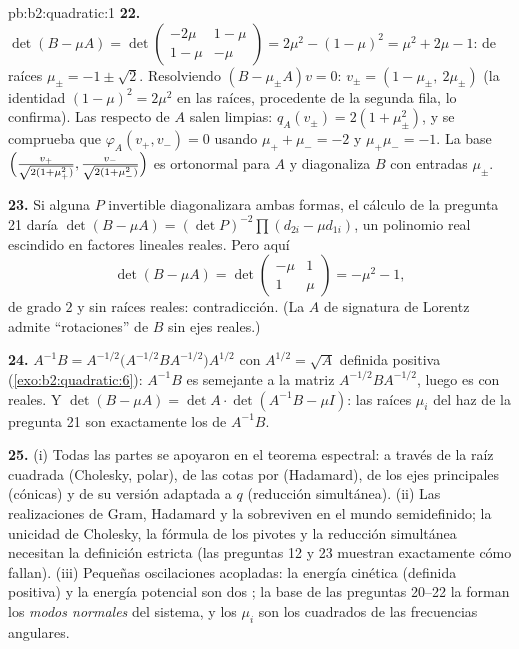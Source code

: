 \begin{solution}{pb:b2:quadratic:1}
\textbf{22.} $\det(B - \mu A) = \det\begin{pmatrix} -2\mu & 1-\mu\\
1-\mu & -\mu\end{pmatrix} = 2\mu^2 - (1-\mu)^2 = \mu^2 + 2\mu - 1$: de
raíces $\mu_\pm = -1 \pm \sqrt2$. Resolviendo $(B - \mu_\pm A)v = 0$:
$v_\pm = (1 - \mu_\pm,\ 2\mu_\pm)$ (la identidad $(1-\mu)^2 = 2\mu^2$
en las raíces, procedente de la segunda fila, lo confirma). Las 
respecto de $A$ salen limpias: $q_A(v_\pm) = 2(1 + \mu_\pm^2)$, y se
comprueba que $\varphi_A(v_+, v_-) = 0$ usando $\mu_+ + \mu_- = -2$ y
$\mu_+\mu_- = -1$. La base $\Bigl(\frac{v_+}{\sqrt{2(1 + \mu_+^2)}},
\frac{v_-}{\sqrt{2(1+\mu_-^2)}}\Bigr)$ es ortonormal para $A$ y
diagonaliza $B$ con entradas $\mu_\pm$.

\textbf{23.} Si alguna $P$ invertible diagonalizara ambas formas, el
cálculo de la pregunta 21 daría $\det(B - \mu A) = (\det
P)^{-2}\prod(d_{2i} - \mu d_{1i})$, un polinomio real escindido en
factores lineales reales. Pero aquí
\[
\det(B - \mu A) = \det\begin{pmatrix} -\mu & 1\\ 1 &
\mu\end{pmatrix} = -\mu^2 - 1 ,
\]
de grado $2$ y sin raíces reales: contradicción. (La $A$ de signatura
de Lorentz admite ``rotaciones'' de $B$ sin ejes reales.)

\textbf{24.} $A^{-1}B = A^{-1/2}\bigl(A^{-1/2}BA^{-1/2}\bigr) A^{1/2}$
con $A^{1/2} = \sqrt A$ definida positiva (\cref{exo:b2:quadratic:6}):
$A^{-1}B$ es semejante a la matriz \emph{}
$A^{-1/2}BA^{-1/2}$, luego es  con 
reales. Y $\det(B - \mu A) = \det A\cdot \det(A^{-1}B - \mu I)$: las
raíces $\mu_i$ del haz de la pregunta 21 son exactamente los
 de $A^{-1}B$.

\textbf{25.} (i) Todas las partes se apoyaron en el teorema espectral:
a través de la raíz cuadrada (Cholesky, polar), de las cotas por
 (Hadamard), de los ejes principales (cónicas) y de su
versión adaptada a $q$ (reducción simultánea). (ii) Las realizaciones
de Gram, Hadamard y la  sobreviven en el mundo
semidefinido; la unicidad de Cholesky, la fórmula de los pivotes y la
reducción simultánea necesitan la definición estricta (las preguntas 12
y 23 muestran exactamente cómo fallan). (iii) Pequeñas oscilaciones
acopladas: la energía cinética (definida positiva) y la energía
potencial son dos ; la base de las preguntas 20--22
la forman los \emph{modos normales} del sistema, y los $\mu_i$ son los
cuadrados de las frecuencias angulares.
\end{solution}
